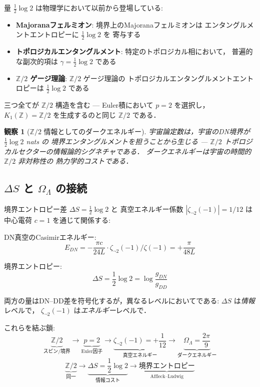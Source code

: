 \documentclass[11pt,a4paper]{article}
\newtheorem{observation}{観察}
\begin{document}
量 $\frac{1}{2}\log 2$ は物理学において以前から登場している:
\begin{itemize}
\item \textbf{Majoranaフェルミオン}: 境界上のMajoranaフェルミオンは
エンタングルメントエントロピーに $\frac{1}{2}\log 2$ を
寄与する~\cite{Kitaev2006}
\item \textbf{トポロジカルエンタングルメント}: 特定のトポロジカル相において，
普遍的な副次的項は $\gamma = \frac{1}{2}\log 2$ である
\item \textbf{$\mathbb{Z}/2$ ゲージ理論}: $\mathbb{Z}/2$ ゲージ理論の
トポロジカルエンタングルメントエントロピーは $\frac{1}{2}\log 2$ である
\end{itemize}

三つ全てが $\mathbb{Z}/2$ 構造を含む --- Euler積において $p = 2$ を選択し，
$K_1(\mathbb{Z}) = \mathbb{Z}/2$ を生成するのと同じ $\mathbb{Z}/2$ である．

\begin{observation}[$\mathbb{Z}/2$ 情報としてのダークエネルギー]
宇宙論定数は，宇宙のDN境界が $\frac{1}{2}\log 2$ nats の
境界エンタングルメントを担うことから生じる
--- $\mathbb{Z}/2$ トポロジカルセクターの情報論的シグネチャである．
ダークエネルギーは\emph{宇宙の時間的 $\mathbb{Z}/2$ 非対称性の
熱力学的コスト}である．
\end{observation}

\subsection{$\Delta S$ と $\Omega_\Lambda$ の接続}

境界エントロピー差 $\Delta S = \frac{1}{2}\log 2$ と
真空エネルギー係数 $|\zeta_{\neg 2}(-1)| = 1/12$ は
中心電荷 $c = 1$ を通じて関係する:

DN真空のCasimirエネルギー:
\begin{equation}
E_{DN} = -\frac{\pi c}{24 L}\cdot\zeta_{\neg 2}(-1)/\zeta(-1) = +\frac{\pi}{48 L}
\end{equation}

境界エントロピー:
\begin{equation}
\Delta S = \frac{1}{2}\log 2 = \log\frac{g_{DN}}{g_{DD}}
\end{equation}

両方の量はDN--DD差を符号化するが，異なるレベルにおいてである:
$\Delta S$ は\emph{情報}レベルで，
$\zeta_{\neg 2}(-1)$ は\emph{エネルギー}レベルで．

これらを結ぶ鎖:
\begin{equation}
\underbrace{\mathbb{Z}/2}_{\text{スピン/境界}}
\to \underbrace{p = 2}_{\text{Euler因子}}
\to \underbrace{\zeta_{\neg 2}(-1) = +\frac{1}{12}}_{\text{真空エネルギー}}
\to \underbrace{\Omega_\Lambda = \frac{2\pi}{9}}_{\text{ダークエネルギー}}
\end{equation}
\begin{equation}
\underbrace{\mathbb{Z}/2}_{\text{同一}}
\to \underbrace{\Delta S = \frac{1}{2}\log 2}_{\text{情報コスト}}
\to \underbrace{\text{境界エントロピー}}_{\text{Affleck--Ludwig}}
\end{equation}
\end{document}

